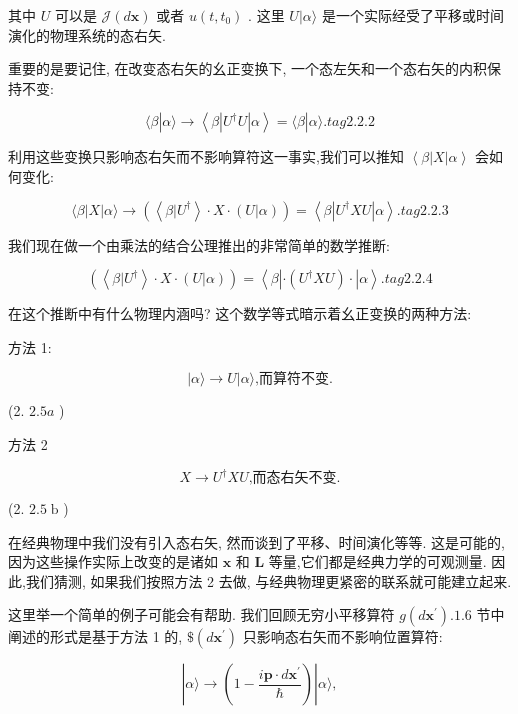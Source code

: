 \documentclass[lang=cn,newtx,10pt,scheme=chinese,thmcnt=section]{elegantbook}
\begin{document}
其中 $U$ 可以是 $\mathcal{J}\left( {d\mathbf{x}}\right)$ 或者 $u\left( {t,{t}_{0}}\right)$ . 这里 $U | \alpha \rangle$ 是一个实际经受了平移或时间演化的物理系统的态右矢.

重要的是要记住, 在改变态右矢的幺正变换下, 一个态左矢和一个态右矢的内积保持不变:

$$
\langle \beta | \alpha \rangle \rightarrow \left\langle {\beta \left| {{U}^{ \dagger }U}\right| \alpha }\right\rangle = \langle \beta | \alpha \rangle . tag{2.2.2}
$$

利用这些变换只影响态右矢而不影响算符这一事实,我们可以推知 $\left\langle {\beta \left| X\right| \alpha }\right\rangle$ 会如何变化:

$$
\langle \beta \left| X\right| \alpha \rangle \rightarrow \left( {\left\langle {\beta | {U}^{ \dagger }}\right\rangle \cdot X \cdot \left( {U | \alpha }\right) }\right) = \left\langle {\beta \left| {{U}^{ \dagger }{XU}}\right| \alpha }\right\rangle . tag{2.2.3}
$$

我们现在做一个由乘法的结合公理推出的非常简单的数学推断:

$$
\left( {\left\langle {\beta | {U}^{ \dagger }}\right\rangle \cdot X \cdot \left( {U | \alpha }\right) }\right) = \left\langle {\beta \left| {\cdot \left( {{U}^{ \dagger }{XU}}\right) \cdot }\right| \alpha }\right\rangle . tag{2.2.4}
$$

在这个推断中有什么物理内涵吗? 这个数学等式暗示着幺正变换的两种方法:

方法 1:

$$
\left| {\alpha \rangle \rightarrow U}\right| \alpha \rangle \text{,而算符不变.}
$$

(2. ${2.5a}$ )

方法 2

$$
X \rightarrow {U}^{ \dagger }{XU}\text{,而态右矢不变.}
$$

(2. ${2.5}\mathrm{\;b}$ )

在经典物理中我们没有引入态右矢, 然而谈到了平移、时间演化等等. 这是可能的, 因为这些操作实际上改变的是诸如 $\mathbf{x}$ 和 $\mathbf{L}$ 等量,它们都是经典力学的可观测量. 因此,我们猜测, 如果我们按照方法 2 去做, 与经典物理更紧密的联系就可能建立起来.

这里举一个简单的例子可能会有帮助. 我们回顾无穷小平移算符 $g\left( {d{\mathbf{x}}^{\prime }}\right) .{1.6}$ 节中阐述的形式是基于方法 1 的, $\$ \left( {d{\mathbf{x}}^{\prime }}\right)$ 只影响态右矢而不影响位置算符:

$$
\left| {\alpha \rangle \rightarrow \left( {1 - \frac{i\mathbf{p} \cdot d{\mathbf{x}}^{\prime }}{\hbar }}\right) }\right| \alpha \rangle ,
$$
\end{document}
